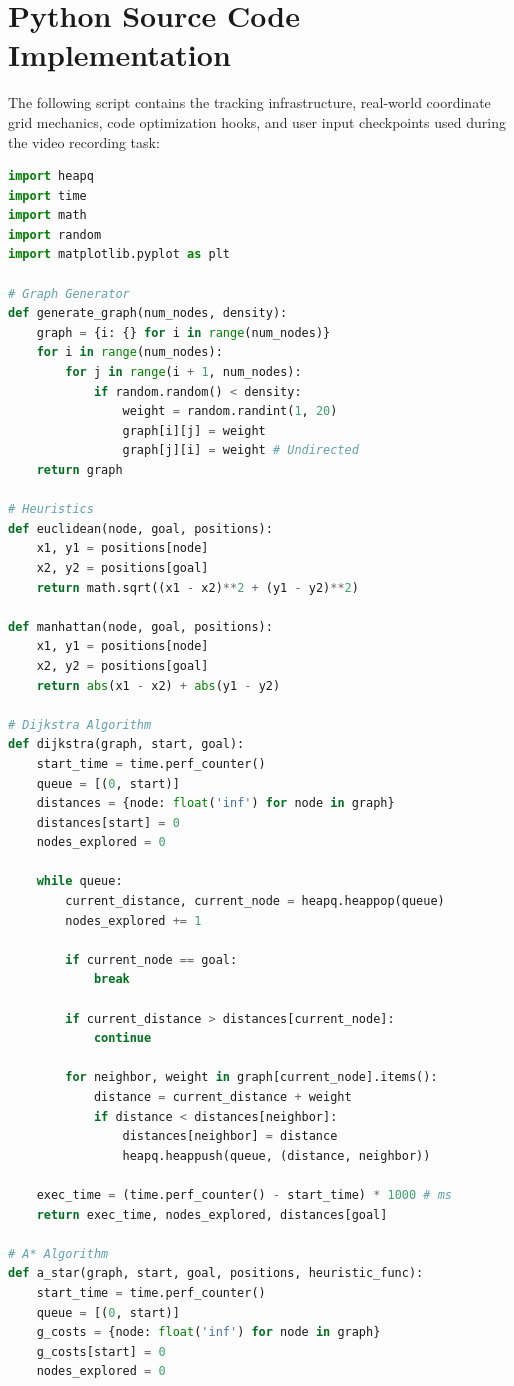 \documentclass[11pt,a4paper]{article}
\begin{document}
\section{Python Source Code Implementation}
The following script contains the tracking infrastructure, real-world coordinate grid mechanics, code optimization hooks, and user input checkpoints used during the video recording task:

\begin{lstlisting}[language=Python, caption={Dijkstra vs A* Performance Suite}]
import heapq
import time
import math
import random
import matplotlib.pyplot as plt

# Graph Generator
def generate_graph(num_nodes, density):
    graph = {i: {} for i in range(num_nodes)}
    for i in range(num_nodes):
        for j in range(i + 1, num_nodes):
            if random.random() < density:
                weight = random.randint(1, 20)
                graph[i][j] = weight
                graph[j][i] = weight # Undirected
    return graph

# Heuristics
def euclidean(node, goal, positions):
    x1, y1 = positions[node]
    x2, y2 = positions[goal]
    return math.sqrt((x1 - x2)**2 + (y1 - y2)**2)

def manhattan(node, goal, positions):
    x1, y1 = positions[node]
    x2, y2 = positions[goal]
    return abs(x1 - x2) + abs(y1 - y2)

# Dijkstra Algorithm
def dijkstra(graph, start, goal):
    start_time = time.perf_counter()
    queue = [(0, start)]
    distances = {node: float('inf') for node in graph}
    distances[start] = 0
    nodes_explored = 0

    while queue:
        current_distance, current_node = heapq.heappop(queue)
        nodes_explored += 1

        if current_node == goal:
            break

        if current_distance > distances[current_node]:
            continue

        for neighbor, weight in graph[current_node].items():
            distance = current_distance + weight
            if distance < distances[neighbor]:
                distances[neighbor] = distance
                heapq.heappush(queue, (distance, neighbor))

    exec_time = (time.perf_counter() - start_time) * 1000 # ms
    return exec_time, nodes_explored, distances[goal]

# A* Algorithm
def a_star(graph, start, goal, positions, heuristic_func):
    start_time = time.perf_counter()
    queue = [(0, start)]
    g_costs = {node: float('inf') for node in graph}
    g_costs[start] = 0
    nodes_explored = 0


\end{lstlisting}
\end{document}
